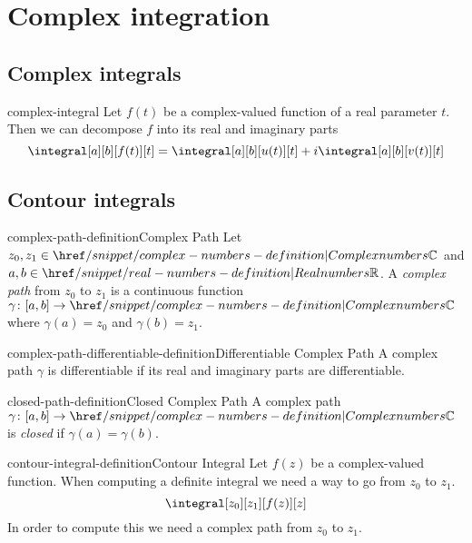 \documentclass[preview]{standalone}
\begin{document}
\genpage

\section{Complex integration}

\subsection{Complex integrals}

\begin{snippet}{complex-integral}
Let \(f(t)\) be a complex-valued function of a real parameter \(t\). Then
we can decompose \(f\) into its real and imaginary parts
\[
    \integral[a][b][f(t)][t]=\integral[a][b][u(t)][t]+i\integral[a][b][v(t)][t]
\]
\end{snippet}

\subsection{Contour integrals}

\begin{snippetdefinition}{complex-path-definition}{Complex Path}
    Let \(z_0, z_1 \in \complexnumbers\) and \(a,b\in \realnumbers\).
    A \textit{complex path} from \(z_0\) to \(z_1\) is a continuous function
    \(\gamma\colon [a,b] \to \complexnumbers\) where \(\gamma(a)=z_0\) and \(\gamma(b)=z_1\).
\end{snippetdefinition}

\begin{snippetdefinition}{complex-path-differentiable-definition}{Differentiable Complex Path}
    A complex path \(\gamma\) is differentiable if its real and imaginary parts are differentiable.
\end{snippetdefinition}

\begin{snippetdefinition}{closed-path-definition}{Closed Complex Path}
    A complex path \(\gamma\colon [a,b] \to \complexnumbers\)
    is \textit{closed} if \(\gamma(a)=\gamma(b)\).
\end{snippetdefinition}

\begin{snippetdefinition}{contour-integral-definition}{Contour Integral}
    Let \(f(z)\) be a complex-valued function.
    When computing a definite integral we need a way to go from \(z_0\) to \(z_1\).
    \[
        \integral[z_0][z_1][f(z)][z]
    \]
    In order to compute this we need a complex path from \(z_0\) to \(z_1\).
\end{snippetdefinition}
\end{document}
